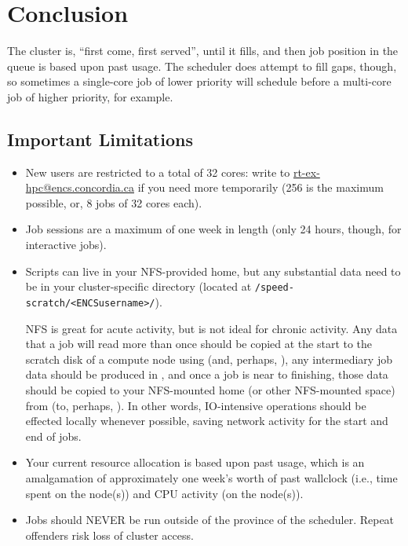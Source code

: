 \documentclass{easychair}
\begin{document}
\section{Conclusion}
\label{sect:conclusion}

The cluster is, ``first come, first served'', until it fills, and then job
position in the queue is based upon past usage. The scheduler does attempt
to fill gaps, though, so sometimes a single-core job of lower priority
will schedule before a multi-core job of higher priority, for example.

\subsection{Important Limitations}
\label{sect:limitations}

\begin{itemize}
\item
New users are restricted to a total of 32 cores: write to \url{rt-ex-hpc@encs.concordia.ca}
if you need more temporarily (256 is the maximum possible, or, 8 jobs of 32 cores each).

\item
Job sessions are a maximum of one week in length (only 24 hours, though,
for interactive jobs).

\item
Scripts can live in your NFS-provided home, but any substantial data need
to be in your cluster-specific directory
(located at \verb+/speed-scratch/<ENCSusername>/+).

NFS is great for acute activity, but is not ideal for chronic activity.
Any data that a job will 
read more than once should be copied at the start to the scratch disk of a 
compute node using  (and, perhaps, ), 
any intermediary job data should be produced in , and once a 
job is near to finishing, those data should be copied to your NFS-mounted 
home (or other NFS-mounted space) from  (to, perhaps,
). In other words, IO-intensive operations should be effected 
locally whenever possible, saving network activity for the start and end of 
jobs. 

\item
Your current resource allocation is based upon past usage, which is an 
amalgamation of approximately one week's worth of past wallclock (i.e., time 
spent on the node(s)) and CPU activity (on the node(s)).

\item
Jobs should NEVER be run outside of the province of the scheduler. Repeat 
offenders risk loss of cluster access. 

\end{itemize}
\end{document}
